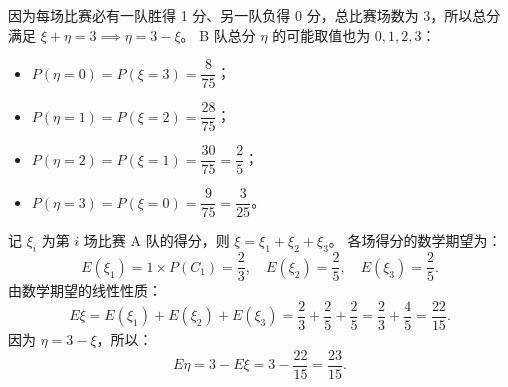 \begin{answer}
因为每场比赛必有一队胜得 1 分、另一队负得 0 分，总比赛场数为 3，所以总分满足 $\xi + \eta = 3 \implies \eta = 3 - \xi$。
B 队总分 $\eta$ 的可能取值也为 $0, 1, 2, 3$：
\begin{itemize}
\item $P(\eta = 0) = P(\xi = 3) = \dfrac{8}{75}$；
\item $P(\eta = 1) = P(\xi = 2) = \dfrac{28}{75}$；
\item $P(\eta = 2) = P(\xi = 1) = \dfrac{30}{75} = \dfrac{2}{5}$；
\item $P(\eta = 3) = P(\xi = 0) = \dfrac{9}{75} = \dfrac{3}{25}$。
\end{itemize}


记 $\xi_i$ 为第 $i$ 场比赛 A 队的得分，则 $\xi = \xi_1 + \xi_2 + \xi_3$。
各场得分的数学期望为：
\nopagebreak[4]
\[E(\xi_1) = 1 \times P(C_1) = \frac{2}{3}, \quad E(\xi_2) = \frac{2}{5}, \quad E(\xi_3) = \frac{2}{5}.\]
由数学期望的线性性质：
\nopagebreak[4]
\[E\xi = E(\xi_1) + E(\xi_2) + E(\xi_3) = \frac{2}{3} + \frac{2}{5} + \frac{2}{5} = \frac{2}{3} + \frac{4}{5} = \frac{22}{15}.\]
因为 $\eta = 3 - \xi$，所以：
\nopagebreak[4]
\[E\eta = 3 - E\xi = 3 - \frac{22}{15} = \frac{23}{15}.\]



\end{answer}

